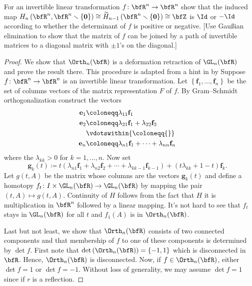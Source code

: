 \begin{problem}[Hatcher {\S}2.2, Ex.\@ 7]
For an invertible linear transformation $f\colon\bfR^n\to\bfR^n$ show that
the induced map
$H_n\left(\bfR^n,\bfR^n\smallsetminus\{\mathbf{0}\}\right)\cong\widetilde
H_{n-1}\left(\bfR^n\smallsetminus\{\mathbf{0}\}\right)\cong\bfZ$ is $\Id$ or $-\Id$
according to whether the determinant of $f$ is positive or negative. [Use
Gaußian elimination to show that the matrix of $f$ can be joined by a path
of invertible matrices to a diagonal matrix with $\pm 1$'s on the
diagonal.]
\end{problem}
\begin{proof}
We show that $\Orth_n(\bfR)$ is a deformation retraction of $\GL_n(\bfR)$
and prove the result there. This procedure is adapted from a hint in
\emph{} by  Suppose $f\colon\bfR^n\to\bfR^n$ is
an invertible linear transformation. Let
$\left\{\mathbf{f}_1,...,\mathbf{f}_n\right\}$ be the set of columns
vectors of the matrix representation $F$ of $f$. By Gram--Schmidt
orthogonalization construct the vectors
\begin{equation}
\label{eq:gram-schmidt-orth}
\begin{aligned}
\mathbf{e}_1&\coloneqq\lambda_{11}\mathbf{f}_1\\
\mathbf{e}_2&\coloneqq\lambda_{21}\mathbf{f}_1+\lambda_{22}\mathbf{f}_2\\
&\vdotswithin{{}\coloneqq{}}\\
\mathbf{e}_n&\coloneqq\lambda_{n1}\mathbf{f}_1+\cdots+\lambda_{nn}\mathbf{f}_n
\end{aligned}
\end{equation}
where the $\lambda_{kk}>0$ for $k=1,...,n$. Now set
\begin{equation}
\label{eq:vectors-as-function-of-t}
\mathbf{g}_k(t)\coloneqq
t\left(\lambda_{n1}\mathbf{f}_1+\lambda_{n2}\mathbf{f}_2+\cdots+\lambda_{kk-1}\mathbf{f}_{k-1}\right)+(t\lambda_{kk}+1-t)\mathbf{f}_k.
\end{equation}
Let $g(t,A)$ be the matrix whose columns are the vectors $\mathbf{g}_k(t)$
and define a homotopy $f_t\colon I\times\GL_n(\bfR)\to\GL_n(\bfR)$ by mapping
the pair $(t,A)\mapsto g(t,A)$. Continuity of $H$ follows from the fact
that $H$ it is multiplication in $\bfR^n$ followed by a linear
mapping. It's not hard to see that $f_t$ stays in $\GL_n(\bfR)$ for all $t$
and $f_1(A)$ is in $\Orth_n(\bfR)$.

Last but not least, we show that $\Orth_n(\bfR)$ consists of two connected
components and that membership of $f$ to one of these components is
determined by $\det f$. First note that
$\det\left(\Orth_n(\bfR)\right)=\{-1,1\}$ which is disconnected in
$\bfR$. Hence, $\Orth_n(\bfR)$ is disconnected. Now, if
$f\in\Orth_n(\bfR)$, either $\det f=1$ or $\det f=-1$. Without loss of
generality, we may assume $\det f=1$ since if $r$ is a reflection.


\end{proof}
